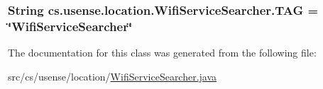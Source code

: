 \subsubsection[{T\+A\+G}]{\setlength{\rightskip}{0pt plus 5cm}String cs.\+usense.\+location.\+Wifi\+Service\+Searcher.\+T\+A\+G = \char`\"{}Wifi\+Service\+Searcher\char`\"{}\hspace{0.3cm}{\ttfamily [private]}}\label{classcs_1_1usense_1_1location_1_1_wifi_service_searcher_a651b6e7c10fad3df5abb64b926094e06}


The documentation for this class was generated from the following file\+:\begin{DoxyCompactItemize}
\item 
src/cs/usense/location/\hyperlink{_wifi_service_searcher_8java}{Wifi\+Service\+Searcher.\+java}\end{DoxyCompactItemize}
